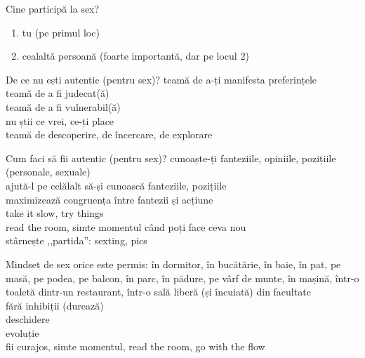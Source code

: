 \documentclass{simple}
\begin{document}
\begin{frame}{Cine participă la sex?}
  \begin{enumerate}
    \Large
    \pause
    \item tu (pe primul loc)
    \pause
    \item cealaltă persoană (foarte importantă, dar pe locul 2)
  \end{enumerate}
\end{frame}

\begin{frame}{De ce nu ești autentic (pentru sex)?}
  \centering
  \Large
  \pause
  teamă de a-ți manifesta preferințele \\
  \vspace{1cm}
  \pause
  teamă de a fi judecat(ă) \\
  \vspace{1cm}
  \pause
  teamă de a fi vulnerabil(ă) \\
  \vspace{1cm}
  \pause
  nu știi ce vrei, ce-ți place \\
  \vspace{1cm}
  \pause
  teamă de descoperire, de încercare, de explorare
\end{frame}

\begin{frame}{Cum faci să fii autentic (pentru sex)?}
  \centering
  \pause
  cunoaște-ți fanteziile, opiniile, pozițiile (personale, sexuale) \\
  \vspace{1cm}
  \pause
  ajută-l pe celălalt să-și cunoască fanteziile, pozițiile \\
  \vspace{1cm}
  \pause
  maximizează congruența între fantezii și acțiune \\
  \vspace{1cm}
  \pause
  take it slow, try things \\
  \vspace{1cm}
  \pause
  read the room, simte momentul când poți face ceva nou \\
  \vspace{1cm}
  \pause
  stârnește ,,partida'': sexting, pics
\end{frame}

\begin{frame}{Mindset de sex}
  \centering
  \pause
  orice este permis: în dormitor, în bucătărie, în baie, în pat, pe masă, pe podea, pe balcon, în parc, în pădure, pe vârf de munte, în mașină, într-o toaletă dintr-un restaurant, într-o sală liberă (și încuiată) din facultate \\
  \vspace{1cm}
  \pause
  fără inhibiții (durează) \\
  \vspace{1cm}
  \pause
  deschidere \\
  \vspace{1cm}
  \pause
  evoluție \\
  \vspace{1cm}
  \pause
  fii curajos, simte momentul, read the room, go with the flow
\end{frame}
\end{document}
